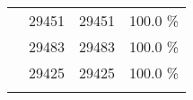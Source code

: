 \documentclass[a4paper, 10pt]{article}
\begin{document}
\begin{itemize}
\begin{table}[h!]
\begin{tabular}{ |c|c|c|c| }
    & 29451 & 29451 &  100.0 \%\\
    & 29483 & 29483 &  100.0 \%\\
    & 29425 & 29425 &  100.0 \%\\
    & & &\\
    \hline

  \end{tabular}
  \label{table:timey_change_ratio}
  \end{table}

\end{itemize}
\end{document}
